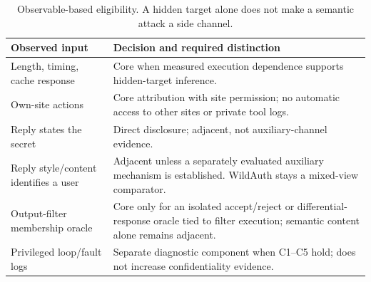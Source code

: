 \begin{table}[t]\centering\footnotesize
\caption{Observable-based eligibility. A hidden target alone does not make a semantic attack a side channel.}\label{tab:boundary-rules}
\begin{tabularx}{\columnwidth}{@{}p{}Y@{}}\toprule
Observed input & Decision and required distinction\\\midrule
Length, timing, cache response & Core when measured execution dependence supports hidden-target inference.\\
Own-site actions & Core attribution with site permission; no automatic access to other sites or private tool logs.\\
Reply states the secret & Direct disclosure; adjacent, not auxiliary-channel evidence.\\
Reply style/content identifies a user & Adjacent unless a separately evaluated auxiliary mechanism is established. WildAuth stays a mixed-view comparator.\\
Output-filter membership oracle & Core only for an isolated accept/reject or differential-response oracle tied to filter execution; semantic content alone remains adjacent.\\
Privileged loop/fault logs & Separate diagnostic component when C1--C5 hold; does not increase confidentiality evidence.\\\bottomrule
\end{tabularx}\end{table}
